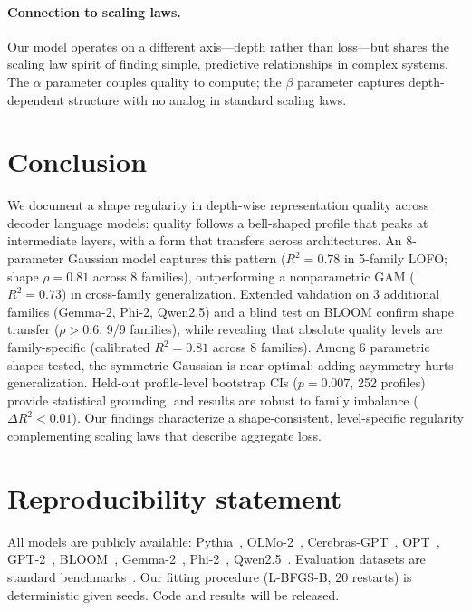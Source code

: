 \documentclass{article}
\begin{document}
\paragraph{Connection to scaling laws.}
Our model operates on a different axis---depth rather than loss---but shares the scaling law spirit of finding simple, predictive relationships in complex systems. The $\alpha$ parameter couples quality to compute; the $\beta$ parameter captures depth-dependent structure with no analog in standard scaling laws.

\section{Conclusion}

We document a shape regularity in depth-wise representation quality across decoder language models: quality follows a bell-shaped profile that peaks at intermediate layers, with a form that transfers across architectures. An 8-parameter Gaussian model captures this pattern ($R^2 = 0.78$ in 5-family LOFO; shape $\rho = 0.81$ across 8 families), outperforming a nonparametric GAM ($R^2 = 0.73$) in cross-family generalization. Extended validation on 3 additional families (Gemma-2, Phi-2, Qwen2.5) and a blind test on BLOOM confirm shape transfer ($\rho > 0.6$, 9/9 families), while revealing that absolute quality levels are family-specific (calibrated $R^2 = 0.81$ across 8 families). Among 6 parametric shapes tested, the symmetric Gaussian is near-optimal: adding asymmetry hurts generalization. Held-out profile-level bootstrap CIs ($p = 0.007$, 252 profiles) provide statistical grounding, and results are robust to family imbalance ($\Delta R^2 < 0.01$). Our findings characterize a shape-consistent, level-specific regularity complementing scaling laws that describe aggregate loss.

\section*{Reproducibility statement}

All models are publicly available: Pythia~\citep{biderman2023pythia}, OLMo-2~\citep{groeneveld2024olmo}, Cerebras-GPT~\citep{dey2023cerebras}, OPT~\citep{zhang2022opt}, GPT-2~\citep{radford2019language}, BLOOM~\citep{workshop2022bloom}, Gemma-2~\citep{team2024gemma2}, Phi-2~\citep{javaheripi2023phi2}, Qwen2.5~\citep{yang2024qwen25}. Evaluation datasets are standard benchmarks~\citep{larson2019clinc, lehmann2015dbpedia, voorhees2000trec, zhang2015yahoo}. Our fitting procedure (L-BFGS-B, 20 restarts) is deterministic given seeds. Code and results will be released.
\end{document}
